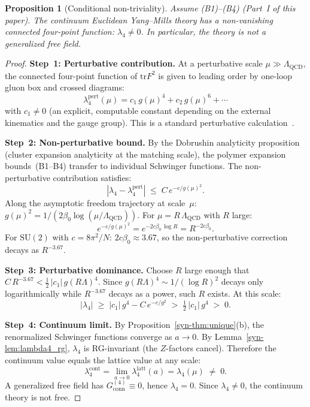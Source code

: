 \documentclass[11pt]{article}
\newtheorem{proposition}[theorem]{Proposition}
\theoremstyle{definition}
\newcommand{\SU}{\mathrm{SU}}
\newcommand{\tr}{\mathrm{tr}}
\begin{document}
\begin{proposition}[Conditional non-triviality]
\label{syn-thm:nontrivial}
Assume (B1)--(B4) (Part~I of this paper).
The continuum Euclidean Yang--Mills theory has a
non-vanishing connected four-point function:
$\lambda_4 \neq 0$.  In particular, the theory is not
a generalized free field.
\end{proposition}

\begin{proof}
\textbf{Step~1: Perturbative contribution.}
At a perturbative scale $\mu \gg \Lambda_{\mathrm{QCD}}$,
the connected four-point function of $\tr F^2$ is given
to leading order by one-loop gluon box and crossed
diagrams:
\begin{equation}\label{syn-eq:lambda4_pert}
  \lambda_4^{\mathrm{pert}}(\mu)
  = c_1\,g(\mu)^4 + c_2\,g(\mu)^6 + \cdots
\end{equation}
with $c_1 \neq 0$ (an explicit, computable constant
depending on the external kinematics and the gauge group).
This is a standard perturbative calculation~\cite{Seiler82}.

\smallskip
\textbf{Step~2: Non-perturbative bound.}
By the Dobrushin analyticity proposition (cluster expansion
analyticity at the matching scale), the polymer expansion
bounds~(B1--B4) transfer to individual Schwinger functions.
The non-perturbative contribution satisfies:
\begin{equation}
  |\lambda_4 - \lambda_4^{\mathrm{pert}}|
  \;\leq\; C\,e^{-c/g(\mu)^2}.
\end{equation}
Along the asymptotic freedom trajectory at
scale~$\mu$: $g(\mu)^2 = 1/(2\beta_0 \log(\mu
/\Lambda_{\mathrm{QCD}}))$.  For
$\mu = R\,\Lambda_{\mathrm{QCD}}$ with $R$ large:
\begin{equation}
  e^{-c/g(\mu)^2}
  = e^{-2c\beta_0\,\log R}
  = R^{-2c\beta_0}.
\end{equation}
For $\SU(2)$ with $c = 8\pi^2/N$:
$2c\beta_0 \approx 3.67$, so the non-perturbative
correction decays as $R^{-3.67}$.

\smallskip
\textbf{Step~3: Perturbative dominance.}
Choose $R$ large enough that
$C\,R^{-3.67} < \tfrac{1}{2}\,|c_1|\,g(R\Lambda)^4$.
Since $g(R\Lambda)^4 \sim 1/(\log R)^2$ decays only
logarithmically while $R^{-3.67}$ decays as a power,
such $R$ exists.  At this scale:
\begin{equation}
  |\lambda_4| \;\geq\;
  |c_1|\,g^4 - C\,e^{-c/g^2}
  \;>\; \tfrac{1}{2}\,|c_1|\,g^4 \;>\; 0.
\end{equation}

\smallskip
\textbf{Step~4: Continuum limit.}
By Proposition~\ref{syn-thm:unique}(b), the renormalized
Schwinger functions converge as $a \to 0$.  By
Lemma~\ref{syn-lem:lambda4_rg}, $\lambda_4$ is
RG-invariant (the $Z$-factors cancel).  Therefore the
continuum value equals the lattice value at any scale:
\begin{equation}
  \lambda_4^{\mathrm{cont}}
  = \lim_{a \to 0} \lambda_4^{\mathrm{latt}}(a)
  = \lambda_4(\mu)
  \;\neq\; 0.
\end{equation}
A generalized free field has
$G_{\mathrm{conn}}^{(4)} \equiv 0$, hence
$\lambda_4 = 0$.  Since $\lambda_4 \neq 0$,
the continuum theory is not free.
\end{proof}
\end{document}
